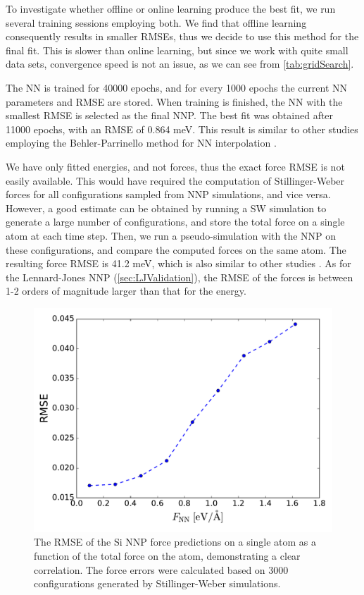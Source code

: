 \documentclass[twoside,english]{uiofysmaster}
\begin{document}
To investigate whether offline or online learning produce the best fit, we run several training sessions employing both. 
We find that offline learning consequently results in smaller RMSEs, thus we decide to use this method for the final fit. 
This is slower than online learning, but since we work with quite small data sets, convergence speed is not an issue, 
as we can see from \autoref{tab:gridSearch}. 

The NN is trained for 40000 epochs, and for every 1000 epochs the current NN parameters 
and RMSE are stored. When training is finished, the NN with the smallest RMSE is selected as the final NNP. 
The best fit was obtained after 11000 epochs, with an RMSE of 0.864 meV. This result is similar to other studies
employing the Behler-Parrinello method for NN interpolation \cite{Behler07,Artrith12,Natarajan16} .  

We have only fitted energies, and not forces, thus the exact force RMSE is not easily available. This would have required 
the computation of Stillinger-Weber forces for all configurations sampled from NNP simulations, and vice versa.
However, a good estimate can be obtained by running a SW simulation to generate a large number of configurations, and 
store the total force on a single atom at each time step. Then, we run a pseudo-simulation with the NNP on these configurations, 
and compare the computed forces on the same atom. The resulting force RMSE is 41.2 meV, 
which is also similar to other studies \cite{Artrith12,Natarajan16}. 
As for the Lennard-Jones NNP (\autoref{sec:LJValidation}), the RMSE of the forces is between 1-2 orders of magnitude 
larger than that for the energy.
\begin{figure}
\centering
  \includegraphics[width = 0.7\linewidth]{Figures/Results/SiForces.pdf}
  \caption{The RMSE of the Si NNP force predictions on a single atom as a function of the total force on the atom,
	   demonstrating a clear correlation. 
	   The force errors were calculated based on 3000 configurations generated by Stillinger-Weber simulations.}
  \label{fig:SiForces}
\end{figure}
\end{document}

